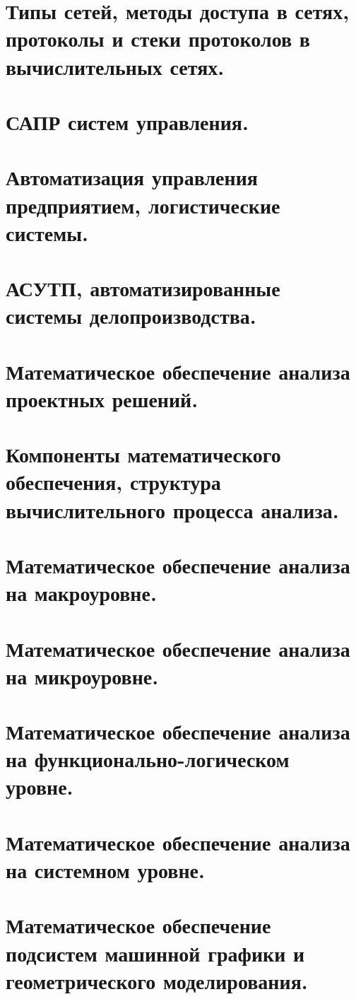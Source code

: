 \documentclass[unicode, 12pt, a4paper, oneside]{article}
\begin{document}
\section{Типы сетей, методы доступа в сетях, протоколы и стеки протоколов в вычислительных сетях.}
\section{САПР систем управления.}
\section{Автоматизация управления предприятием, логистические системы.}
\section{АСУТП, автоматизированные системы делопроизводства.}
\section{Математическое обеспечение анализа проектных решений.}
\section{Компоненты математического обеспечения, структура вычислительного процесса анализа.}
\section{Математическое обеспечение анализа на макроуровне.}
\section{Математическое обеспечение анализа на микроуровне.}
\section{Математическое обеспечение анализа на функционально-логическом уровне.}
\section{Математическое обеспечение анализа на системном уровне.}
\section{Математическое обеспечение подсистем машинной графики и геометрического моделирования.}

\end{document}
